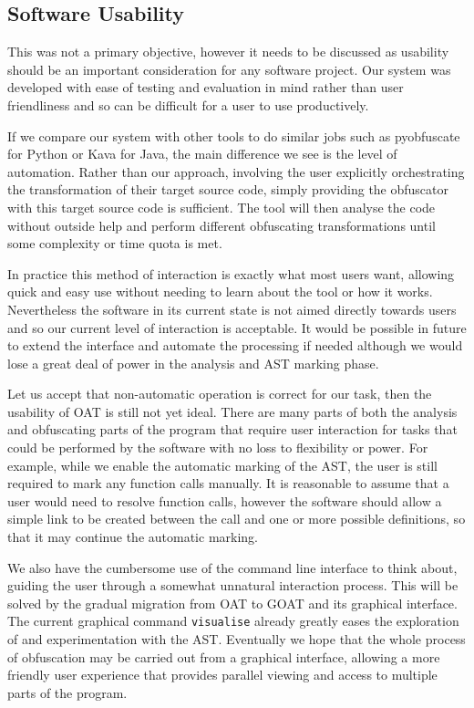 \documentclass[twoside,a4paper]{report}
\begin{document}
\subsection{Software Usability}

This was not a primary objective, however it needs to be discussed as usability should be an important consideration for any software project. Our system
was developed with ease of testing and evaluation in mind rather than user friendliness and so can be difficult for a user to use productively.

If we compare our system with other tools to do similar jobs such as pyobfuscate \cite{pyobf} for Python or Kava \cite{taxobftrans} for Java, the main
difference we see is the level of automation. Rather than our approach, involving the user explicitly orchestrating the transformation of their target
source code, simply providing the obfuscator with this target source code is sufficient. The tool will then analyse the code without outside help
and perform different obfuscating transformations until some complexity or time quota is met.

In practice this method of interaction is exactly what most users want, allowing quick and easy use without needing to learn about the tool or
how it works. Nevertheless the software in its current state is not aimed directly towards users and so our current level of interaction is acceptable.
It would be possible in future to extend the interface and automate the processing if needed although we would lose a great deal of power in the analysis
and AST marking phase.

Let us accept that non-automatic operation is correct for our task, then the usability of OAT is still not yet ideal. There are many parts of both the
analysis and obfuscating parts of the program that require user interaction for tasks that could be performed by the software with no loss to flexibility or
power. For example, while we enable the automatic marking of the AST, the user is still required to mark any function calls manually. It is reasonable
to assume that a user would need to resolve function calls, however the software should allow a simple link to be created between the call and one or more
possible definitions, so that it may continue the automatic marking.

We also have the cumbersome use of the command line interface to think about, guiding the user through a somewhat unnatural interaction process. This will be
solved by the gradual migration from OAT to GOAT and its graphical interface. The current graphical command \texttt{visualise} already greatly eases the
exploration of and experimentation with the AST. Eventually we hope that the whole process of obfuscation may be carried out from a graphical interface,
allowing a more friendly user experience that provides parallel viewing and access to multiple parts of the program.
\end{document}
